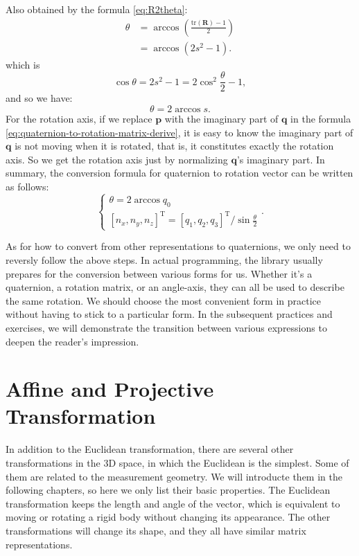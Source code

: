 Also obtained by the formula \eqref{eq:R2theta}:
\begin{equation}
	\begin{aligned}
		\theta &= \arccos(\frac{\mathrm{tr}(\mathbf{R})-1}{2}) \\
		&=\arccos(2s^2-1).
	\end{aligned}
\end{equation}
which is
\begin{equation}
	\cos \theta =2s^2-1=2 \cos^2 \frac{\theta}{2} -1,
\end{equation}
and so we have:
\begin{equation}
	\theta = 2 \arccos s.
\end{equation}
For the rotation axis, if we replace $\mathbf{p}$ with the imaginary part of $\mathbf{q}$ in the formula \eqref{eq:quaternion-to-rotation-matrix-derive}, it is easy to know the imaginary part of  $\mathbf{q}$ is not moving when it is rotated, that is, it constitutes exactly the rotation axis. So we get the rotation axis just by normalizing $\mathbf{q}$'s imaginary part. In summary, the conversion formula for quaternion to rotation vector can be written as follows:
\begin{equation}
	\label{eq:rotationVector2Quaternion}
	\begin{cases}
		\theta = 2\arccos {q_0}\\
		{\left[ {{n_x},{n_y},{n_z}} \right]^\mathrm{T}} = {{{\left[ {{q_1},{q_2},{q_3}} \right] }^\mathrm{T}}}/{\sin \frac{\theta }{2}}
	\end{cases} .
\end{equation}

As for how to convert from other representations to quaternions, we only need to reversly follow the above steps. In actual programming, the library usually prepares for the conversion between various forms for us. Whether it's a quaternion, a rotation matrix, or an angle-axis, they can all be used to describe the same rotation. We should choose the most convenient form in practice without having to stick to a particular form. In the subsequent practices and exercises, we will demonstrate the transition between various expressions to deepen the reader's impression.

\section{Affine and Projective Transformation}
In addition to the Euclidean transformation, there are several other transformations in the 3D space, in which the Euclidean is the simplest. Some of them are related to the measurement geometry. We will introducte them in the following chapters, so here we only list their basic properties. The Euclidean transformation keeps the length and angle of the vector, which is equivalent to moving or rotating a rigid body without changing its appearance. The other transformations will change its shape, and they all have similar matrix representations.

